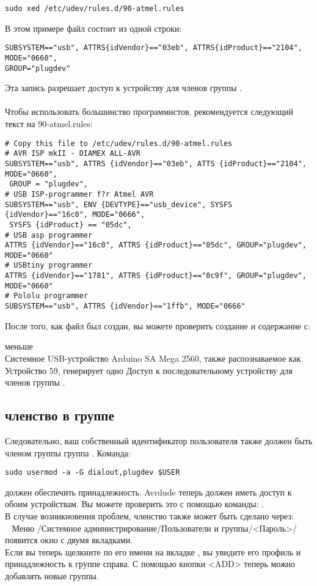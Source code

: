 \begin{large} \vspace{-0.4em} \begin{verbatim}
sudo xed /etc/udev/rules.d/90-atmel.rules
\end{verbatim} \end{large}
В этом примере файл  состоит из одной строки:
\begin{verbatim}
SUBSYSTEM=="usb", ATTRS{idVendor}=="03eb", ATTRS{idProduct}=="2104", MODE="0660",
GROUP="plugdev"
\end{verbatim}
Эта запись разрешает доступ к устройству для членов группы . \\
~ \\
Чтобы использовать большинство программистов, рекомендуется следующий текст на 90-atmel.rules:
\begin{verbatim}
# Copy this file to /etc/udev/rules.d/90-atmel.rules
# AVR ISP mkII - DIAMEX ALL-AVR
SUBSYSTEM=="usb", ATTRS {idVendor}=="03eb", ATTS {idProduct}=="2104", MODE="0660", 
 GROUP = "plugdev",
# USB ISP-programmer f?r Atmel AVR
SUBSYSTEM=="usb", ENV {DEVTYPE}=="usb_device", SYSFS {idVendor}=="16c0", MODE="0666",
 SYSFS {idProduct} == "05dc",
# USB asp programmer
ATTRS {idVendor}=="16c0", ATTRS {idProduct}=="05dc", GROUP="plugdev", MODE="0660"
# USBtiny programmer
ATTRS {idVendor}=="1781", ATTRS {idProduct}=="0c9f", GROUP="plugdev", MODE="0660"
# Pololu programmer
SUBSYSTEM=="usb", ATTRS {idVendor}=="1ffb", MODE="0666"
\end{verbatim}
После того, как файл был создан, вы можете проверить создание и содержание с:

меньше  \\
Системное USB-устройство Arduino SA Mega 2560, также распознаваемое как Устройство 59, генерирует одно
Доступ к последовательному устройству  для членов группы .
\subsection{членство в группе}
Следовательно, ваш собственный идентификатор пользователя также должен быть членом группы 
группа . Команда:

\begin{large} \vspace{-0.4em} \begin{verbatim}
sudo usermod -a -G dialout,plugdev $USER
\end{verbatim} \end{large}
должен обеспечить принадлежность.
Avrdude теперь должен иметь доступ к обоим устройствам.
Вы можете проверить это с помощью команды: . \\
В случае возникновения проблем, членство также может быть сделано через: \\
~ Меню /Системное администрирование/Пользователи и группы/<Пароль>/появится окно с двумя вкладками. \\
Если вы теперь щелкните по его имени на вкладке , вы увидите его профиль и принадлежность к группе справа.
С помощью кнопки <ADD> теперь можно добавлять новые группы.
